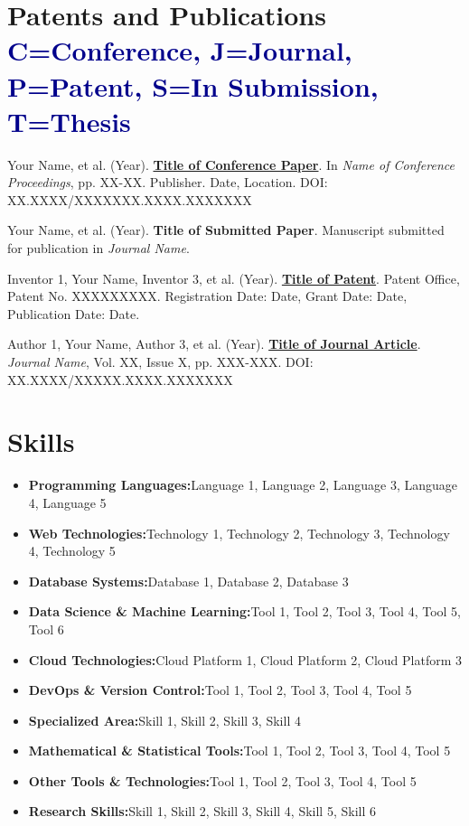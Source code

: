 \documentclass[a4paper,11pt]{article}
\newcommand{\resumeItem}[2]{
	\item{
		\textbf{#1}{\hspace{0.5mm}#2 \vspace{-0.5mm}}
	}
}
\newcommand{\resumeSubItem}[2]{\resumeItem{#1}{#2}\vspace{-4pt}}
\newcommand{\resumeHeadingSkillStart}{\begin{itemize}[leftmargin=*,itemsep=1.7mm, rightmargin=2ex]}
\newcommand{\resumeHeadingSkillEnd}{\end{itemize}\vspace{-2mm}}
\begin{document}
	\section{\textbf{Patents and Publications} \hspace*{\fill} \textcolor{darkblue}{\scriptsize C=Conference, J=Journal, P=Patent, S=In Submission, T=Thesis}}
	\vspace{0.2mm}
	\small{
		\begin{enumerate}[leftmargin=*, labelsep=0.5em, align=left, widest={[\textbf{S.1}]}, itemindent=0em, label={\textbf{[\arabic*]}}]
			\item[\textbf{[C.1]}] Your Name, et al. (Year). \href{https://doi.org/XX.XXXX/XXXXXXX.XXXX.XXXXXXX}{\textbf{Title of Conference Paper}}. In \textit{Name of Conference Proceedings}, pp. XX-XX. Publisher. Date, Location. DOI: XX.XXXX/XXXXXXX.XXXX.XXXXXXX

			\item[\textbf{[S.1]}] Your Name, et al. (Year). \textbf{Title of Submitted Paper}. Manuscript submitted for publication in \textit{Journal Name}.
			
			\item[\textbf{[P.1]}] Inventor 1, Your Name, Inventor 3, et al. (Year). \href{https://patentoffice.gov/patent/XXXXXXXXX}{\textbf{Title of Patent}}. Patent Office, Patent No. XXXXXXXXX. Registration Date: Date, Grant Date: Date, Publication Date: Date.
			
			\item[\textbf{[J.1]}] Author 1, Your Name, Author 3, et al. (Year). \href{https://doi.org/XX.XXXX/XXXXX.XXXX.XXXXXXX}{\textbf{Title of Journal Article}}. \textit{Journal Name}, Vol. XX, Issue X, pp. XXX-XXX. DOI: XX.XXXX/XXXXX.XXXX.XXXXXXX
		\end{enumerate}
	}
	
	\section{\textbf{Skills}}
	\vspace{-0.4mm}
	\resumeHeadingSkillStart
	\resumeSubItem{Programming Languages:}
	{Language 1, Language 2, Language 3, Language 4, Language 5}
	\resumeSubItem{Web Technologies:}
	{Technology 1, Technology 2, Technology 3, Technology 4, Technology 5}
	\resumeSubItem{Database Systems:}
	{Database 1, Database 2, Database 3}
	\resumeSubItem{Data Science \& Machine Learning:}
	{Tool 1, Tool 2, Tool 3, Tool 4, Tool 5, Tool 6}
	\resumeSubItem{Cloud Technologies:}
	{Cloud Platform 1, Cloud Platform 2, Cloud Platform 3}
	\resumeSubItem{DevOps \& Version Control:}
	{Tool 1, Tool 2, Tool 3, Tool 4, Tool 5}
	\resumeSubItem{Specialized Area:}
	{Skill 1, Skill 2, Skill 3, Skill 4}
	\resumeSubItem{Mathematical \& Statistical Tools:}
	{Tool 1, Tool 2, Tool 3, Tool 4, Tool 5}
	\resumeSubItem{Other Tools \& Technologies:}
	{Tool 1, Tool 2, Tool 3, Tool 4, Tool 5}
	\resumeSubItem{Research Skills:}{Skill 1, Skill 2, Skill 3, Skill 4, Skill 5, Skill 6}
	\resumeHeadingSkillEnd
	
\end{document}
